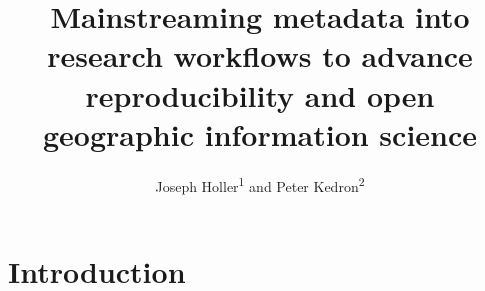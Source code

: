\documentclass{isprs} %
\begin{document}
\title{Mainstreaming metadata into research workflows to advance reproducibility and open geographic information science}
\date{}


\author{Joseph Holler\textsuperscript{1} and Peter Kedron\textsuperscript{2}}

\address{\textsuperscript{1}Department of Geography, Middlebury College - josephh@middlebury.edu \\
\textsuperscript{2}School of Geographical Sciences and Urban Planning, Arizona State University - peter.kedron@asu.edu}




\commission{}{} %
\workinggroup{} %
\icwg{}   %



\maketitle


\sloppy

\section{Introduction}\label{Introduction}
 
\end{document}
